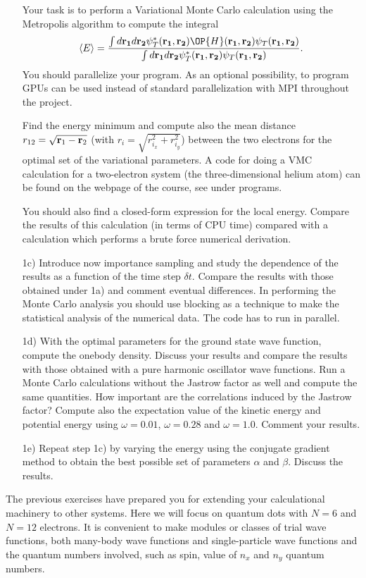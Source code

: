 \begin{prob}
\begin{enumerate}
Your task is to perform a Variational Monte Carlo calculation
using the Metropolis algorithm to compute the integral
\begin{equation}
   \langle E \rangle =
   \frac{\int d{\bf r_1}d{\bf r_2}\psi^{\ast}_T({\bf r_1},{\bf r_2})\OP{H}({\bf r_1},{\bf r_2})\psi_T({\bf r_1},{\bf r_2})}
        {\int d{\bf r_1}d{\bf r_2}\psi^{\ast}_T({\bf r_1},{\bf r_2})\psi_T({\bf r_1},{\bf r_2})}.
\end{equation}
You should parallelize your program. As an optional possibility, to program GPUs can be used 
instead of standard parallelization with MPI throughout the project.

Find the  energy minimum and compute also the mean distance
$r_{12}=\sqrt{{\bf r}_1-{\bf r}_2}$ (with $r_i = \sqrt{r_{i_x}^2+r_{i_y}^2}$) between the two electrons for the optimal set of the variational parameters.
A code for doing a VMC calculation for a two-electron system (the three-dimensional helium atom) can be 
found on the webpage of the course, see under programs.

You should also find a closed-form expression for the local energy. Compare the results of this calculation (in terms of CPU time) compared with a calculation which performs a brute force numerical derivation.
\item[1c)] Introduce now importance sampling and study the dependence of the results as a function of the time step $\delta t$.  
Compare the results with those obtained under 1a) and comment eventual differences.
In performing the Monte Carlo analysis you should use blocking as a technique  to make the statistical analysis of the numerical data.
The code has to run in parallel. 
\item[1d)]  With the optimal parameters for the ground state wave function, compute the onebody density. Discuss your results and compare the results with those obtained with a pure harmonic oscillator wave functions. Run a Monte Carlo calculations without the Jastrow factor as well
and compute the same quantities. How important are the correlations induced by the Jastrow factor?
Compute also the expectation value of the kinetic energy and potential energy using $\omega=0.01$,
$\omega=0.28$ and $\omega=1.0$. Comment your results.
\item[1e)]  Repeat step 1c) by varying the energy using the 
conjugate gradient method to obtain the best possible set of parameters
$\alpha$ and $\beta$. Discuss the results.
\end{enumerate}
The previous exercises have prepared you for extending your calculational machinery  to other systems.
Here we will focus on quantum dots with $N=6$ and $N=12$ electrons.
It is convenient to make modules or classes of trial wave functions, both many-body wave functions
and single-particle wave functions  and the quantum numbers  involved, such as spin, value of $n_x$ and $n_y$
quantum numbers.


\end{prob}
